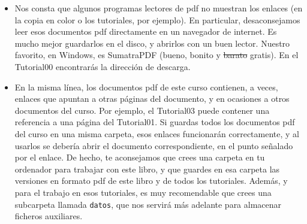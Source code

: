 \begin{itemize}
    \item Nos consta que algunos programas lectores de pdf no muestran los enlaces (en la copia
        en color o los tutoriales, por ejemplo). En particular, desaconsejamos leer esos
        documentos pdf directamente en un navegador de internet. Es mucho mejor guardarlos en el
        disco, y abrirlos con un buen lector. Nuestro favorito, en Windows, es SumatraPDF (bueno,
        bonito y \sout{barato} gratis). En el Tutorial00 encontrarás la dirección de descarga.

    \item En la misma línea, los documentos pdf de este curso contienen, a veces, enlaces que
        apuntan a otras páginas del documento, y en ocasiones a otros documentos del curso. Por
        ejemplo, el Tutorial03 puede contener una referencia a una página del Tutorial01. Si
        guardas todos los documentos pdf del curso en una misma carpeta, esos enlaces funcionarán
        correctamente, y al usarlos se debería abrir el documento correspondiente, en el punto
        señalado por el enlace. De hecho, te aconsejamos que crees una carpeta en tu ordenador para trabajar con este libro, y que guardes en esa carpeta las versiones en formato pdf de este libro y de todos los tutoriales. Además, y para el trabajo en esos tutoriales, es muy recomendable que crees una subcarpeta llamada {\tt datos}, que nos servirá más adelante para almacenar ficheros auxiliares.

\end{itemize}




